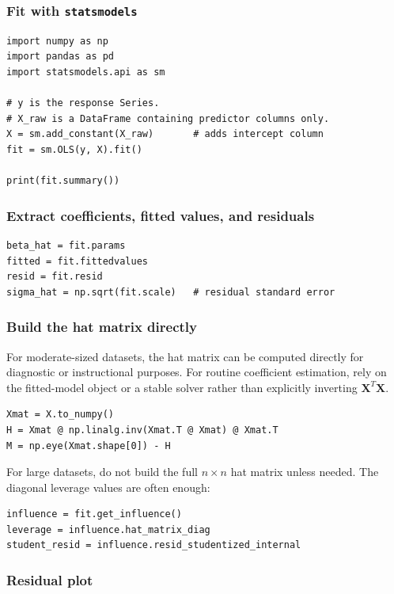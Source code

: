 \subsubsection*{Fit with \texttt{statsmodels}}

\begin{verbatim}
import numpy as np
import pandas as pd
import statsmodels.api as sm

# y is the response Series.
# X_raw is a DataFrame containing predictor columns only.
X = sm.add_constant(X_raw)       # adds intercept column
fit = sm.OLS(y, X).fit()

print(fit.summary())
\end{verbatim}

\subsubsection*{Extract coefficients, fitted values, and residuals}

\begin{verbatim}
beta_hat = fit.params
fitted = fit.fittedvalues
resid = fit.resid
sigma_hat = np.sqrt(fit.scale)   # residual standard error
\end{verbatim}

\subsubsection*{Build the hat matrix directly}

For moderate-sized datasets, the hat matrix can be computed directly for diagnostic or instructional purposes.  For routine coefficient estimation, rely on the fitted-model object or a stable solver rather than explicitly inverting \(\mathbf{X}^T\mathbf{X}\).

\begin{verbatim}
Xmat = X.to_numpy()
H = Xmat @ np.linalg.inv(Xmat.T @ Xmat) @ Xmat.T
M = np.eye(Xmat.shape[0]) - H
\end{verbatim}

For large datasets, do not build the full \(n\times n\) hat matrix unless needed.  The diagonal leverage values are often enough:

\begin{verbatim}
influence = fit.get_influence()
leverage = influence.hat_matrix_diag
student_resid = influence.resid_studentized_internal
\end{verbatim}

\subsubsection*{Residual plot}

